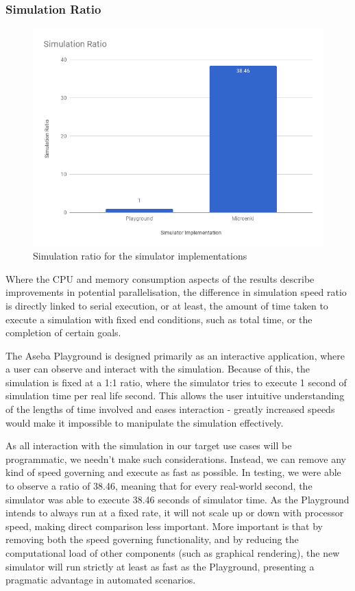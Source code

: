 \subsubsection{Simulation Ratio}
\begin{figure}[!h]
    \centering
    \includegraphics[width=\textwidth]{ratio.png}
    \caption{Simulation ratio for the simulator implementations}
\end{figure}
Where the CPU and memory consumption aspects of the results describe
improvements in potential parallelisation, the difference in simulation speed
ratio is directly linked to serial execution, or at least, the amount of time
taken to execute a simulation with fixed end conditions, such as total time, or
the completion of certain goals.

The Aseba Playground is designed primarily as an interactive application, where
a user can observe and interact with the simulation. Because of this, the
simulation is fixed at a 1:1 ratio, where the simulator tries to execute 1
second of simulation time per real life second. This allows the user intuitive
understanding of the lengths of time involved and eases interaction - greatly
increased speeds would make it impossible to manipulate the simulation
effectively.

As all interaction with the simulation in our target use cases will be
programmatic, we needn't make such considerations. Instead, we can remove any
kind of speed governing and execute as fast as possible. In testing, we were
able to observe a ratio of 38.46, meaning that for every real-world second,
the simulator was able to execute 38.46 seconds of simulator time. As the
Playground intends to always run at a fixed rate, it will not scale up or down
with processor speed, making direct comparison less important. More important
is that by removing both the speed governing functionality, and by reducing the
computational load of other components (such as graphical rendering), the new
simulator will run strictly at least as fast as the Playground, presenting a
pragmatic advantage in automated scenarios.
